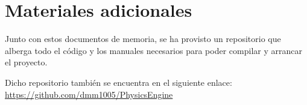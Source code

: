 \section{Materiales adicionales}

Junto con estos documentos de memoria, se ha provisto un repositorio que alberga todo el código y los manuales necesarios para poder compilar y arrancar el proyecto.

Dicho repositorio también se encuentra en el siguiente enlace: \url{https://github.com/dmm1005/PhysicsEngine}

